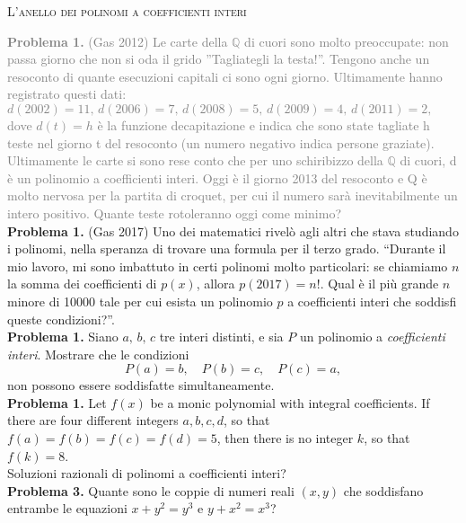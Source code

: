 \documentclass[a4paper]{article}
\theoremstyle{remark}
\theoremstyle{definition}
\begin{document}
\begin{center}
	\textsc{L'anello dei polinomi a coefficienti interi}
\end{center}

\begin{multicols}{2}
	\textcolor{gray}{\textbf{Problema 1.} (Gas 2012) Le carte della $ \mathbb{Q} $ di cuori sono molto preoccupate: non passa giorno che non si oda il grido ”Tagliategli la testa!”. Tengono anche un resoconto
	di quante esecuzioni capitali ci sono ogni giorno. Ultimamente hanno registrato questi dati:
	$ d(2002) = 11, \, 
	d(2006) = 7, \, 
	d(2008) = 5,\, 
	d(2009) = 4,\,
	d(2011) = 2 ,\, 
	 $ dove $ d(t) = h $ è la funzione decapitazione e indica che sono state tagliate h teste nel giorno t del resoconto (un numero negativo indica persone
	graziate). Ultimamente le carte si sono rese conto che per uno schiribizzo della $ \mathbb{Q} $ di cuori, d è un polinomio a coefficienti interi. Oggi è il
	giorno 2013 del resoconto e Q è molto nervosa per la partita di croquet, per cui il numero sarà inevitabilmente un intero positivo. Quante teste
	rotoleranno oggi come minimo?} \\
	
	
	\textbf{Problema 1.} (Gas 2017) Uno dei matematici rivelò agli altri che stava studiando i polinomi, nella speranza di trovare una formula per il terzo grado.
	“Durante il mio lavoro, mi sono imbattuto in certi polinomi molto particolari: se chiamiamo $ n $ la somma dei coefficienti di
	$ p(x) $, allora $ p(2017) = n! $. Qual è il più grande $ n  $ minore di 10000 tale per cui esista un polinomio $ p $ a coefficienti interi che
	soddisfi queste condizioni?”. \\
	
	\textbf{Problema 1.} Siano $ a,\, b,\, c $ tre interi distinti, e sia $ P $ un polinomio a \emph{coefficienti interi}. Mostrare che le condizioni $$  P(a) = b,\quad P(b) = c,\quad P(c) = a,  $$ non possono essere soddisfatte simultaneamente. \\
	
	\textbf{Problema 1.} Let $ f (x) $ be a monic polynomial with integral coefficients. If there are four different
	integers $ a, b, c, d $, so that $ f (a) = f (b) = f (c) = f (d) = 5 $, then there is no
	integer $ k $, so that $ f (k) = 8 $. \\
	
	Soluzioni razionali di polinomi a coefficienti interi? \\
	
	\textbf{Problema 3.} Quante sono le coppie di numeri reali $ (x,y) $ che soddisfano entrambe le equazioni $ x + y^2 = y^3 $ e $ y + x^2 = x^3 $?
	

\end{multicols}
\end{document}
